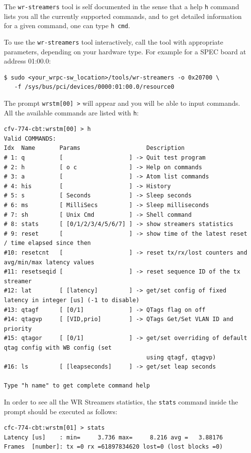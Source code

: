 \documentclass[a4paper, 12pt]{article}
\renewcommand{\_}{\underscore\allowbreak}
\begin{document}
The \texttt{wr-streamers} tool is self documented in the sense that a help
\texttt{h} command lists you all the currently supported commands, and to get
detailed information for a given command, one can type \texttt{h cmd}. 

To use the \texttt{wr-streamers} tool interactively, call the tool with appropriate
parameters, depending on your hardware type. For example for a SPEC board at
address 01:00.0:
\begin{lstlisting}
$ sudo <your_wrpc-sw_location>/tools/wr-streamers -o 0x20700 \
   -f /sys/bus/pci/devices/0000:01:00.0/resource0
\end{lstlisting}

The prompt \texttt{wrstm[00] >} will appear and you will be able to input commands.
All the available commands are listed with \texttt{h}:
\begin{lstlisting}[basicstyle=\scriptsize\ttfamily]
cfv-774-cbt:wrstm[00] > h
Valid COMMANDS:
Idx  Name       Params                   Description
# 1: q          [                   ] -> Quit test program
# 2: h          [ o c               ] -> Help on commands
# 3: a          [                   ] -> Atom list commands
# 4: his        [                   ] -> History
# 5: s          [ Seconds           ] -> Sleep seconds
# 6: ms         [ MilliSecs         ] -> Sleep milliseconds
# 7: sh         [ Unix Cmd          ] -> Shell command
# 8: stats      [ [0/1/2/3/4/5/6/7] ] -> show streamers statistics
# 9: reset      [                   ] -> show time of the latest reset / time elapsed since then
#10: resetcnt   [                   ] -> reset tx/rx/lost counters and avg/min/max latency values
#11: resetseqid [                   ] -> reset sequence ID of the tx streamer
#12: lat        [ [latency]         ] -> get/set config of fixed latency in integer [us] (-1 to disable)
#13: qtagf      [ [0/1]             ] -> QTags flag on off
#14: qtagvp     [ [VID,prio]        ] -> QTags Get/Set VLAN ID and priority
#15: qtagor     [ [0/1]             ] -> get/set overriding of default qtag config with WB config (set
                                         using qtagf, qtagvp)
#16: ls         [ [leapseconds]     ] -> get/set leap seconds

Type "h name" to get complete command help
\end{lstlisting}
In order to see all the WR Streamers statistics, the \texttt{stats} command
inside the prompt should be executed as follows:
\begin{lstlisting}
cfc-774-cbt:wrstm[01] > stats
Latency [us]    : min=     3.736 max=     8.216 avg =   3.88176 
Frames  [number]: tx =0 rx =61897834620 lost=0 (lost blocks =0)
\end{lstlisting}
\end{document}
